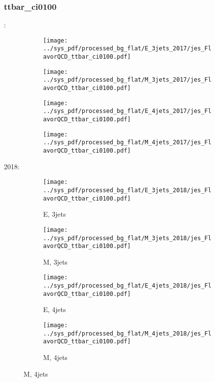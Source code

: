 \documentclass{beamer}
\begin{document}
\begin{frame}
\frametitle{ttbar_ci0100}
\fontsize{5}{1}:
\begin{figure}
\centering
\begin{subfigure}[b]{0.24\textwidth}
\texttt{[image: ../sys\_pdf/processed\_bg\_flat/E\_3jets\_2017/jes\_FlavorQCD\_ttbar\_ci0100.pdf]}
\end{subfigure}
\begin{subfigure}[b]{0.24\textwidth}
\texttt{[image: ../sys\_pdf/processed\_bg\_flat/M\_3jets\_2017/jes\_FlavorQCD\_ttbar\_ci0100.pdf]}
\end{subfigure}
\begin{subfigure}[b]{0.24\textwidth}
\texttt{[image: ../sys\_pdf/processed\_bg\_flat/E\_4jets\_2017/jes\_FlavorQCD\_ttbar\_ci0100.pdf]}
\end{subfigure}
\begin{subfigure}[b]{0.24\textwidth}
\texttt{[image: ../sys\_pdf/processed\_bg\_flat/M\_4jets\_2017/jes\_FlavorQCD\_ttbar\_ci0100.pdf]}
\end{subfigure}
\end{figure}
2018:
\begin{figure}
\centering
\begin{subfigure}[b]{0.24\textwidth}
\texttt{[image: ../sys\_pdf/processed\_bg\_flat/E\_3jets\_2018/jes\_FlavorQCD\_ttbar\_ci0100.pdf]}
\captionsetup{font=tiny}
\caption{E, 3jets}
\end{subfigure}
\begin{subfigure}[b]{0.24\textwidth}
\texttt{[image: ../sys\_pdf/processed\_bg\_flat/M\_3jets\_2018/jes\_FlavorQCD\_ttbar\_ci0100.pdf]}
\captionsetup{font=tiny}
\caption{M, 3jets}
\end{subfigure}
\begin{subfigure}[b]{0.24\textwidth}
\texttt{[image: ../sys\_pdf/processed\_bg\_flat/E\_4jets\_2018/jes\_FlavorQCD\_ttbar\_ci0100.pdf]}
\captionsetup{font=tiny}
\caption{E, 4jets}
\end{subfigure}
\begin{subfigure}[b]{0.24\textwidth}
\texttt{[image: ../sys\_pdf/processed\_bg\_flat/M\_4jets\_2018/jes\_FlavorQCD\_ttbar\_ci0100.pdf]}
\captionsetup{font=tiny}
\caption{M, 4jets}
\end{subfigure}
\end{figure}
\end{frame}
\end{document}
